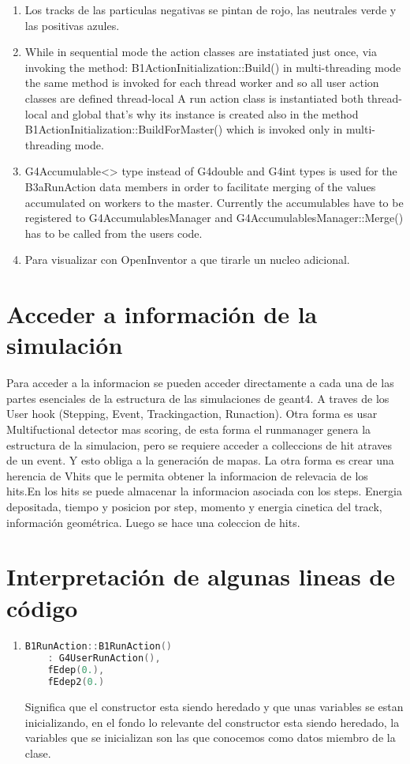 \documentclass[10pt,a4paper,oneside]{book}
\begin{document}
\begin{enumerate}
\item Los tracks de las particulas negativas se pintan de rojo, las
  neutrales verde y las positivas azules.
\item While in sequential mode the action classes are instatiated just
  once, via invoking the method: B1ActionInitialization::Build() in
  multi-threading mode the same method is invoked for each thread
  worker and so all user action classes are defined thread-local
  A run action class is instantiated both thread-local and global
  that's why its instance is created also in the method
  B1ActionInitialization::BuildForMaster() which is invoked only in
  multi-threading mode.
\item G4Accumulable<> type instead of G4double and G4int types is used
  for the B3aRunAction data members in order to facilitate merging of
  the values accumulated on workers to the master. Currently the
  accumulables have to be registered to G4AccumulablesManager and
  G4AccumulablesManager::Merge() has to be called from the users code.
\item Para visualizar con OpenInventor a que tirarle un nucleo
  adicional.
\end{enumerate}





\section*{Acceder a información de la simulación}
Para acceder a la informacion se pueden acceder directamente a cada
una de las partes esenciales de la estructura de las simulaciones de
geant4. A traves de los User hook (Stepping, Event, Trackingaction,
Runaction). Otra forma es usar Multifuctional detector mas scoring, de
esta forma el runmanager genera la estructura de la simulacion, pero
se requiere acceder a colleccions de hit atraves de un event. Y esto
obliga a la generación de mapas.  La otra forma es crear una herencia
de Vhits que le permita obtener la informacion de relevacia de los
hits.En los hits se puede almacenar la informacion asociada con los
steps. Energia depositada, tiempo y posicion por step, momento y
energia cinetica del track, información geométrica. Luego se hace una
coleccion de hits.




\section*{Interpretación de algunas lineas de código}
\begin{enumerate}
\item
  \begin{lstlisting}[language=C++, frame = single]
    B1RunAction::B1RunAction()
    : G4UserRunAction(),
    fEdep(0.),
    fEdep2(0.)
  \end{lstlisting}
 

  Significa que el constructor esta siendo heredado y que unas variables
  se estan inicializando, en el fondo lo relevante del constructor esta
  siendo heredado, la variables que se inicializan son las que conocemos
  como datos miembro de la clase.
\end{enumerate}
\end{document}
